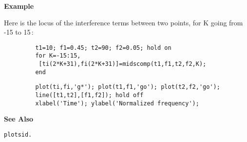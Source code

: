 {\bf \large {}\selectfont Example}\\
\hspace*{1.5cm}
\begin{minipage}[t]{13.5cm}
Here is the locus of the interference terms between two points, for {\ty K} going
from -15 to 15\,:
\begin{verbatim}
         t1=10; f1=0.45; t2=90; f2=0.05; hold on
         for K=-15:15,
          [ti(2*K+31),fi(2*K+31)]=midscomp(t1,f1,t2,f2,K);
         end
\end{verbatim}
\end{minipage}
\hspace*{1.5cm}
\begin{minipage}[t]{13.5cm}
\begin{verbatim}
         plot(ti,fi,'g*'); plot(t1,f1,'go'); plot(t2,f2,'go');
         line([t1,t2],[f1,f2]); hold off
         xlabel('Time'); ylabel('Normalized frequency');
\end{verbatim}
\end{minipage}
\vspace*{.5cm}


{\bf \large {}\selectfont See Also}\\
\hspace*{1.5cm}
\begin{minipage}[t]{13.5cm}
\begin{verbatim}
plotsid.
\end{verbatim}
\end{minipage}

